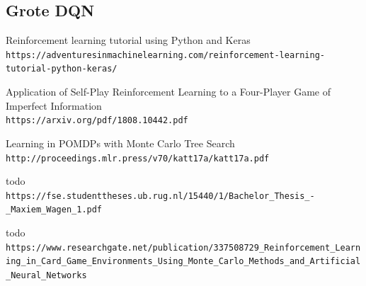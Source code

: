 \documentclass[11pt]{article}
\begin{document}
\subsection{Grote DQN}

\newpage
\begin{thebibliography}{9}
Reinforcement learning tutorial using Python and Keras 
\\\texttt{https://adventuresinmachinelearning.com/reinforcement-learning-tutorial-python-keras/}

Application of Self-Play Reinforcement Learning to a Four-Player Game of Imperfect Information
\\\texttt{https://arxiv.org/pdf/1808.10442.pdf}

Learning in POMDPs with Monte Carlo Tree Search
\\\texttt{http://proceedings.mlr.press/v70/katt17a/katt17a.pdf}

todo
\\\texttt{https://fse.studenttheses.ub.rug.nl/15440/1/Bachelor_Thesis_-_Maxiem_Wagen_1.pdf}

todo
\\\texttt{https://www.researchgate.net/publication/337508729_Reinforcement_Learning_in_Card_Game_Environments_Using_Monte_Carlo_Methods_and_Artificial_Neural_Networks}
\end{thebibliography}
\end{document}
